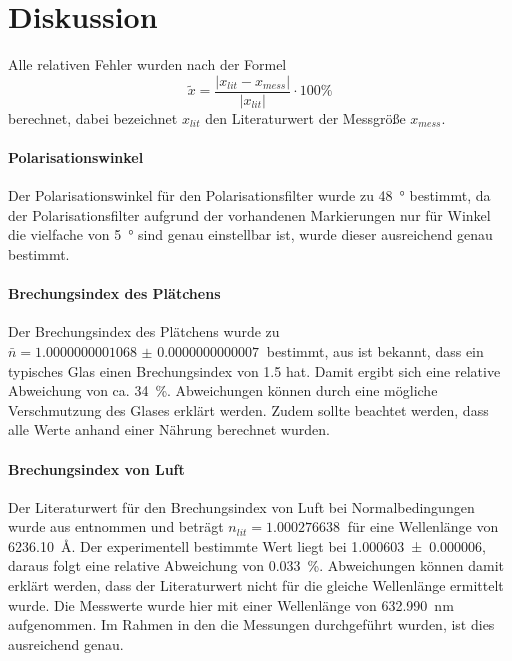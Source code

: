 \section{Diskussion}
\label{sec:Diskussion}
Alle relativen Fehler wurden nach der Formel
\begin{equation*}
  \tilde{x} = \frac{ \lvert x_{lit} - x_{mess} \rvert}{\lvert x_{lit} \rvert}
  \cdot 100 \%
\end{equation*}
berechnet, dabei bezeichnet $x_{lit}$ den Literaturwert der Messgröße $x_{mess}$. 
\paragraph{Polarisationswinkel}
Der Polarisationswinkel für den Polarisationsfilter wurde zu \SI{48}{\degree} bestimmt, da der 
Polarisationsfilter aufgrund der vorhandenen Markierungen nur für Winkel 
die vielfache von \SI{5}{\degree} sind genau einstellbar ist, wurde 
dieser ausreichend genau bestimmt.
\paragraph{Brechungsindex des Plätchens} 
Der Brechungsindex des Plätchens wurde zu \\$\bar{n} = \SI{1.0000000001068(7)}{}$ bestimmt, aus 
\cite{Anleitung} ist bekannt, dass ein typisches Glas einen Brechungsindex von \SI{1.5}{} hat. 
Damit ergibt sich eine relative Abweichung von ca. \SI{34}{\percent}. Abweichungen können durch eine 
mögliche Verschmutzung des Glases erklärt werden. Zudem sollte beachtet werden, dass alle Werte anhand einer 
Nährung berechnet wurden.
\paragraph{Brechungsindex von Luft} 
Der Literaturwert für den Brechungsindex von Luft bei Normalbedingungen wurde aus 
\cite{brechlit} entnommen und beträgt $n_{lit} = \SI{1.000276638}{}$ für eine Wellenlänge von 
\SI{6236.10}{\angstrom}. Der experimentell bestimmte Wert liegt bei \SI{1.000603(6)}{}, 
daraus folgt eine relative Abweichung von \SI{0.033}{\percent}. Abweichungen können damit erklärt werden, dass 
der Literaturwert nicht für die gleiche Wellenlänge ermittelt wurde. Die Messwerte wurde hier mit einer 
Wellenlänge von \SI{632.990}{\nano\meter} aufgenommen. Im Rahmen in den die Messungen durchgeführt wurden, 
ist dies ausreichend genau. 
